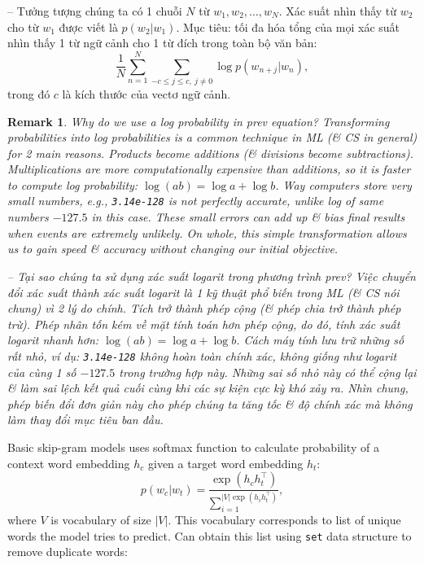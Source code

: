 \documentclass{article}
\newtheorem{remark}{Remark}
\begin{document}
\begin{itemize}
\begin{itemize}
\begin{itemize}
            -- Tưởng tượng chúng ta có 1 chuỗi $N$ từ $w_1,w_2,\ldots,w_N$. Xác suất nhìn thấy từ $w_2$ cho từ $w_1$ được viết là $p(w_2|w_1)$. Mục tiêu: tối đa hóa tổng của mọi xác suất nhìn thấy 1 từ ngữ cảnh cho 1 từ đích trong toàn bộ văn bản:
            \begin{equation*}
                \frac{1}{N}\sum_{n=1}^N\sum_{-c\le j\le c,\ j\ne0} \log p(w_{n+j}|w_n),
            \end{equation*}
            trong đó $c$ là kích thước của vectơ ngữ cảnh.

            \begin{remark}
                Why do we use a log probability in prev equation? Transforming probabilities into log probabilities is a common technique in ML (\& CS in general) for 2 main reasons. Products become additions (\& divisions become subtractions). Multiplications are more computationally expensive than additions, so it is faster to compute log probability: $\log(ab) = \log a + \log b$. Way computers store very small numbers, e.g., {\tt3.14e-128} is not perfectly accurate, unlike log of same numbers $-127.5$ in this case. These small errors can add up \& bias final results when events are extremely unlikely. On whole, this simple transformation allows us to gain speed \& accuracy without changing our initial objective.

                -- Tại sao chúng ta sử dụng xác suất logarit trong phương trình prev? Việc chuyển đổi xác suất thành xác suất logarit là 1 kỹ thuật phổ biến trong ML (\& CS nói chung) vì 2 lý do chính. Tích trở thành phép cộng (\& phép chia trở thành phép trừ). Phép nhân tốn kém về mặt tính toán hơn phép cộng, do đó, tính xác suất logarit nhanh hơn: $\log(ab) = \log a + \log b$. Cách máy tính lưu trữ những số rất nhỏ, ví dụ: {\tt3.14e-128} không hoàn toàn chính xác, không giống như logarit của cùng 1 số $-127.5$ trong trường hợp này. Những sai số nhỏ này có thể cộng lại \& làm sai lệch kết quả cuối cùng khi các sự kiện cực kỳ khó xảy ra. Nhìn chung, phép biến đổi đơn giản này cho phép chúng ta tăng tốc \& độ chính xác mà không làm thay đổi mục tiêu ban đầu.
            \end{remark}
            Basic skip-gram models uses softmax function to calculate probability of a context word embedding $h_c$ given a target word embedding $h_t$:
            \begin{equation*}
                p(w_c|w_t) = \frac{\exp(h_ch_t^\top)}{\sum_{i=1}^{|V| \exp(h_ih_t^\top)}},
            \end{equation*}
            where $V$ is vocabulary of size $|V|$. This vocabulary corresponds to list of unique words the model tries to predict. Can obtain this list using {\tt set} data structure to remove duplicate words:


\end{itemize}
\end{itemize}
\end{itemize}
\end{document}
